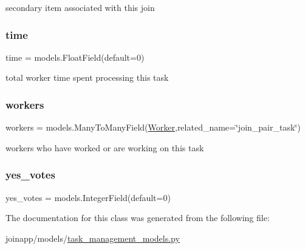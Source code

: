 secondary item associated with this join 

\mbox{\label{classjoinapp_1_1models_1_1task__management__models_1_1_join_pair_task_a70c092a6aebace0b1ea406e14da78a40}} 
\subsubsection{\texorpdfstring{time}{time}}
{\footnotesize\ttfamily time = models.\+Float\+Field(default=0)\hspace{0.3cm}{\ttfamily [static]}}



total worker time spent processing this task 

\mbox{\label{classjoinapp_1_1models_1_1task__management__models_1_1_join_pair_task_a42a0cd7f4a34b940f08fd182458c9aba}} 
\subsubsection{\texorpdfstring{workers}{workers}}
{\footnotesize\ttfamily workers = models.\+Many\+To\+Many\+Field(\mbox{\hyperlink{classjoinapp_1_1models_1_1task__management__models_1_1_worker}{Worker}},related\+\_\+name=\char`\"{}join\+\_\+pair\+\_\+task\char`\"{})\hspace{0.3cm}{\ttfamily [static]}}



workers who have worked or are working on this task 

\mbox{\label{classjoinapp_1_1models_1_1task__management__models_1_1_join_pair_task_ab50f50bde4c2c1524460c48def8f27f3}} 
\subsubsection{\texorpdfstring{yes\_votes}{yes\_votes}}
{\footnotesize\ttfamily yes\+\_\+votes = models.\+Integer\+Field(default=0)\hspace{0.3cm}{\ttfamily [static]}}



The documentation for this class was generated from the following file\+:\begin{DoxyCompactItemize}
\item 
joinapp/models/\mbox{\hyperlink{task__management__models_8py}{task\+\_\+management\+\_\+models.\+py}}\end{DoxyCompactItemize}
